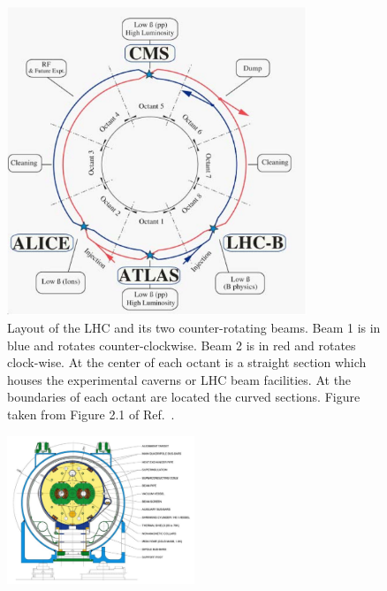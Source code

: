 \begin{figure}[!htb]
    \begin{center}
        \includegraphics[width=0.8\textwidth]{figures/chapter2/lhc_layout}
        \caption{
            Layout of the LHC and its two counter-rotating beams. Beam 1 is in blue and rotates
            counter-clockwise. Beam 2 is in red and rotates clock-wise.
            At the center of each octant is a straight section which houses
            the experimental caverns or LHC beam facilities.
            At the boundaries of each octant are located the curved sections.
            Figure taken from Figure 2.1 of Ref.~\cite{Evans_2008}.
        }
        \label{fig:lhc_layout}
    \end{center}
\end{figure}

\begin{figure}[!htb]
    \begin{center}
        \includegraphics[width=0.5\textwidth]{figures/chapter2/lhc_dipole_fig3p3}
        \caption{
        }
        \label{fig:lhc_dipole_xsec}
    \end{center}
\end{figure}

